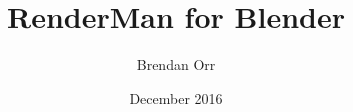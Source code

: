 \documentclass[letterpaper,11pt,twoside]{book}
\begin{document}
\author{Brendan Orr}
\title{RenderMan for Blender}
\date{December 2016}



\frontmatter
\maketitle


\pagestyle{fancy}
\fancyhead{}
\fancyfoot{}
\fancyfoot[RO,LE]{\thepage}

\renewcommand{\headrulewidth}{0.4pt}
\renewcommand{\footrulewidth}{0.4pt}
\renewcommand{\voffset}{0.0pt}

\tableofcontents
\mainmatter









\backmatter
\end{document}
